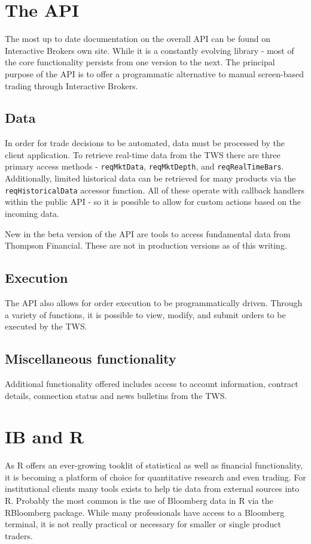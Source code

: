 \documentclass{article}
\begin{document}
\section{The API}
The most up to date documentation on the overall API can be found
on Interactive Brokers own site. While it is a constantly evolving
library - most of the core functionality persists from
one version to the next. The principal purpose of the API is to
offer a programmatic alternative to manual screen-based trading
through Interactive Brokers.

\subsection{Data}
In order for trade decisions to be automated, data
must be processed by the client application. To retrieve
real-time data from the TWS there are three primary
access methods - {\tt reqMktData},
{\tt reqMktDepth}, and {\tt reqRealTimeBars}.  Additionally,
limited historical data can be retrieved for many products
via the {\tt reqHistoricalData} accessor function. All of these
operate with callback handlers within the public API - so
it is possible to allow for custom actions based on the
incoming data.

New in the beta version of the API are tools to access
fundamental data from Thompson Financial.  These are
not in production versions as of this writing.

\subsection{Execution}
The API also allows for order execution to be programmatically
driven. Through a variety of functions, it is possible
to view, modify, and submit orders to be executed by
the TWS.

\subsection{Miscellaneous functionality}
Additional functionality offered includes access
to account information, contract details, connection
status and news bulletins from the TWS.

\section{IB and R}
As R offers an ever-growing tooklit of statistical as well
as financial functionality, it is becoming a platform
of choice for quantitative research and even trading. For
institutional clients many tools exists to help
tie data from external sources into R. Probably the most
common is the use of Bloomberg data in R via the
RBloomberg package.  While many professionals have
access to a Bloomberg terminal, it is not really practical
or necessary for smaller or single product traders.
\end{document}
